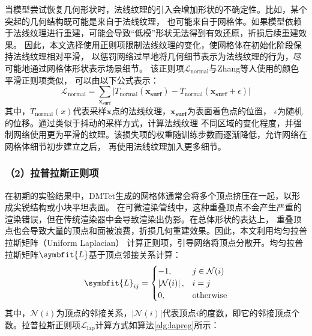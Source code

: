 当模型尝试恢复几何形状时，法线纹理的引入会增加形状的不确定性。比如，某个突起的几何结构既可能是来自于法线纹理，
也可能来自于网格体。如果模型依赖于法线纹理进行重建，可能会导致“低模”形状无法得到有效还原，折损后续重建效果。
因此，本文选择使用正则项限制法线纹理的变化，使网格体在初始化阶段保持法线纹理相对平滑，
以惩罚网络过早地将几何细节表示为法线纹理的行为，尽可能地通过网格体形状表示场景细节。
该正则项$\mathcal{L}_{\text{normal}}$与Zhang等人\cite{zhang2021nerfactor}使用的颜色平滑正则项类似，
可以由以下公式表示：
\begin{equation}
  \label{eq:nrm_smooth}
  \mathcal{L}_{\text{normal}} = \sum_{\boldsymbol{x_\text{surf}}} {\lvert {T_{\text{normal}}({\boldsymbol{x_\text{surf}}})} - {T_{\text{normal}}({\boldsymbol{x_\text{surf}}}+\epsilon)}\rvert}
\end{equation}
其中，$T_{\text{normal}}(x)$代表采样$\boldsymbol{x}$点的法线纹理，$\boldsymbol{x_\text{surf}}$为表面着色点的位置，
$\epsilon$为随机的位移。通过类似于抖动的采样方式，计算法线纹理
不同区域的变化程度，并强制网络使用更为平滑的纹理。该损失项的权重随训练步数而逐渐降低，允许网络在网格体细节初步建立之后，
再使用法线纹理加入更多细节。

\subsubsection*{（2）拉普拉斯正则项}

在初期的实验结果中，DMTet生成的网格体通常会将多个顶点挤压在一起，以形成尖锐结构或小块平坦表面。
在可微渲染管线中，这种重叠顶点不会产生严重的渲染错误，但在传统渲染器中会导致渲染出伪影。在总体形状的表达上，
重叠顶点也会导致大量的顶点和面被浪费，折损几何重建效果。因此，本文利用均匀拉普拉斯矩阵（Uniform Laplacian）
计算正则项，引导网络将顶点分散开。均匀拉普拉斯矩阵$\symbfit{L}$基于顶点邻接关系计算：
\begin{equation}
  \symbfit{L}_{ij} =
  \begin{cases}
  -1, & j \in \mathcal{N}(i) \\
  \left|\mathcal{N}(i)\right|, & i = j \\
  0, & \text{otherwise}
  \end{cases}
  \label{eq:uniform_lap}
\end{equation}
其中，$\mathcal{N}(i)$为顶点的邻接关系，$\left|\mathcal{N}(i)\right|$代表顶点$i$的度数，即它的邻接顶点个数。拉普拉斯正则项$\mathcal{L}_\text{lap}$计算方式如算法\ref{alg:lapreg}所示：
\renewcommand{\algorithmicrequire}{\textbf{输入：}\unskip}
\renewcommand{\algorithmicensure}{\textbf{输出：}\unskip}

